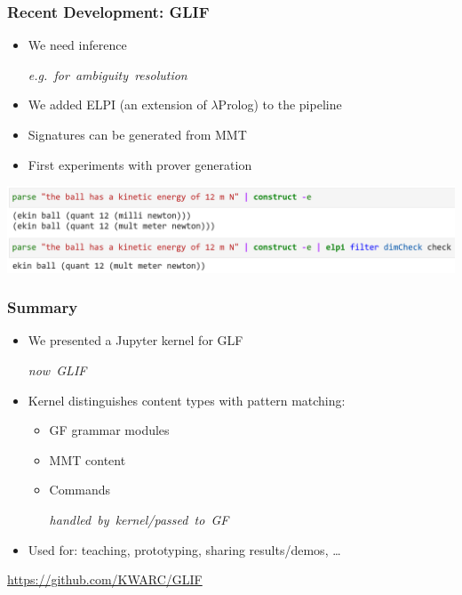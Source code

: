 \documentclass{beamer}
\def\str#1{{\color{black!60!green}``\textit{#1}''}}
\newcommand{\com}[1]{\strut\hfil\strut\null\nobreak\hfill\hbox{{\itshape \color{black!50}#1}}\par}
\begin{document}
\begin{frame}
    \frametitle{Recent Development: GLIF}
    \begin{itemize}
        \item We need inference \com{e.g. for ambiguity resolution}
        \item We added ELPI (an extension of $\lambda$Prolog) to the pipeline
        \item Signatures can be generated from MMT
        \item First experiments with prover generation
    \end{itemize}

    \centering
    \vspace{2em}
    \includegraphics[scale=0.3]{filter.png}
\end{frame}

\begin{frame}
    \frametitle{Summary}
    \begin{itemize}
        \item We presented a Jupyter kernel for GLF \com{now GLIF}
        \item Kernel distinguishes content types with pattern matching:
            \begin{itemize}
                \item GF grammar modules
                \item MMT content
                \item Commands \com{handled by kernel/passed to GF}
            \end{itemize}
        \item Used for: teaching, prototyping, sharing results/demos, \dots
    \end{itemize}

    \vspace{0.8em}
    \centering
    \resizebox{0.6\textwidth}{!}{
        
    }

    \vspace{0.8em}
    \large \url{https://github.com/KWARC/GLIF}
\end{frame}
\end{document}
